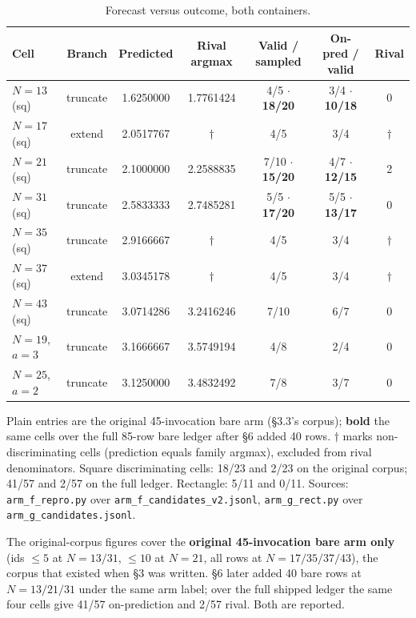 \begin{table}[!ht]
\centering
\caption{Forecast versus outcome, both containers.}
\label{tab:forecast}
\small
\begin{tabular}{@{}lcccccc@{}}
\toprule
Cell & Branch & Predicted & Rival argmax & Valid / sampled & On-pred / valid & Rival \\
\midrule
$N{=}13$ (sq) & truncate & 1.6250000 & 1.7761424 & 4/5 $\cdot$ \textbf{18/20} & 3/4 $\cdot$ \textbf{10/18} & 0 \\
$N{=}17$ (sq) & extend & 2.0517767 & $\dagger$ & 4/5 & 3/4 & $\dagger$ \\
$N{=}21$ (sq) & truncate & 2.1000000 & 2.2588835 & 7/10 $\cdot$ \textbf{15/20} & 4/7 $\cdot$ \textbf{12/15} & 2 \\
$N{=}31$ (sq) & truncate & 2.5833333 & 2.7485281 & 5/5 $\cdot$ \textbf{17/20} & 5/5 $\cdot$ \textbf{13/17} & 0 \\
$N{=}35$ (sq) & truncate & 2.9166667 & $\dagger$ & 4/5 & 3/4 & $\dagger$ \\
$N{=}37$ (sq) & extend & 3.0345178 & $\dagger$ & 4/5 & 3/4 & $\dagger$ \\
$N{=}43$ (sq) & truncate & 3.0714286 & 3.2416246 & 7/10 & 6/7 & 0 \\
$N{=}19$, $a{=}3$ & truncate & 3.1666667 & 3.5749194 & 4/8 & 2/4 & 0 \\
$N{=}25$, $a{=}2$ & truncate & 3.1250000 & 3.4832492 & 7/8 & 3/7 & 0 \\
\bottomrule
\end{tabular}

\vspace{0.5ex}
\begin{minipage}{0.95\linewidth}
\footnotesize
Plain entries are the original 45-invocation bare arm (\S3.3's corpus); \textbf{bold} the same cells
over the full 85-row bare ledger after \S6 added 40 rows. $\dagger$ marks non-discriminating cells
(prediction equals family argmax), excluded from rival denominators. Square discriminating
cells: 18/23 and 2/23 on the original corpus; 41/57 and 2/57 on the full ledger. Rectangle:
5/11 and 0/11. Sources: \texttt{arm\_f\_repro.py} over \texttt{arm\_f\_candidates\_v2.jsonl}, \texttt{arm\_g\_rect.py} over
\texttt{arm\_g\_candidates.jsonl}.
\end{minipage}
\end{table}

The original-corpus figures cover the \textbf{original 45-invocation bare arm only} (ids $\le 5$ at
$N = 13/31$, $\le 10$ at $N = 21$, all rows at $N = 17/35/37/43$), the corpus that existed when \S3
was written. \S6 later added 40 bare rows at $N = 13/21/31$ under the same arm label; over the full
shipped ledger the same four cells give 41/57 on-prediction and 2/57 rival. Both are reported.

